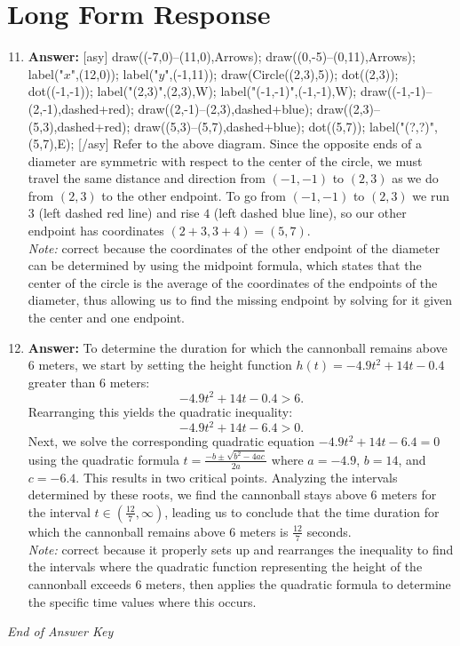 \documentclass[12pt]{article}
\begin{document}
\section*{Long Form Response}
\begin{enumerate}[label=\arabic*.]
\setcounter{enumi}{10}
\item \textbf{Answer:} [asy] draw((-7,0)--(11,0),Arrows); draw((0,-5)--(0,11),Arrows); label("$x$",(12,0)); label("$y$",(-1,11)); draw(Circle((2,3),5)); dot((2,3)); dot((-1,-1)); label("(2,3)",(2,3),W); label("(-1,-1)",(-1,-1),W); draw((-1,-1)--(2,-1),dashed+red); draw((2,-1)--(2,3),dashed+blue); draw((2,3)--(5,3),dashed+red); draw((5,3)--(5,7),dashed+blue); dot((5,7)); label("(?,?)",(5,7),E); [/asy] Refer to the above diagram. Since the opposite ends of a diameter are symmetric with respect to the center of the circle, we must travel the same distance and direction from $(-1,-1)$ to $(2,3)$ as we do from $(2,3)$ to the other endpoint. To go from $(-1,-1)$ to $(2,3)$ we run $3$ (left dashed red line) and rise $4$ (left dashed blue line), so our other endpoint has coordinates $(2+3,3+4)=\boxed{(5,7)}$.
\\ \textit{Note:} correct because the coordinates of the other endpoint of the diameter can be determined by using the midpoint formula, which states that the center of the circle is the average of the coordinates of the endpoints of the diameter, thus allowing us to find the missing endpoint by solving for it given the center and one endpoint.
\item \textbf{Answer:} To determine the duration for which the cannonball remains above 6 meters, we start by setting the height function \( h(t) = -4.9 t^2 + 14 t - 0.4 \) greater than 6 meters: \[ -4.9 t^2 + 14 t - 0.4 > 6. \] Rearranging this yields the quadratic inequality: \[ -4.9 t^2 + 14 t - 6.4 > 0. \] Next, we solve the corresponding quadratic equation \( -4.9 t^2 + 14 t - 6.4 = 0 \) using the quadratic formula \( t = \frac{-b \pm \sqrt{b^2 - 4 ac}}{2 a} \) where \( a = -4.9 \), \( b = 14 \), and \( c = -6.4 \). This results in two critical points. Analyzing the intervals determined by these roots, we find the cannonball stays above 6 meters for the interval \( t \in \left( \frac{12}{7}, \infty \right) \), leading us to conclude that the time duration for which the cannonball remains above 6 meters is \( \frac{12}{7} \) seconds.
\\ \textit{Note:} correct because it properly sets up and rearranges the inequality to find the intervals where the quadratic function representing the height of the cannonball exceeds 6 meters, then applies the quadratic formula to determine the specific time values where this occurs.
\end{enumerate}

\vfill
\noindent\textit{End of Answer Key}
\end{document}
